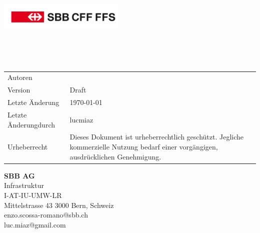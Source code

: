 \pagestyle{title}
\begin{titlepage}
	\sffamily
	\begin{flushright}
	\includegraphics[width=60mm]{packages/logo.pdf}
	\end{flushright}
	\vspace{10\baselineskip}
	\parbox{165mm}{{\noindent\Huge\bfseries \thetitle}\\[\baselineskip]
	\noindent\Large\bfseries }
	\\[8\baselineskip]
	{\footnotesize
	\begin{tabularx}{150mm}{@{}l X}
		Autoren 		& \theauthor \\
		Version 		& Draft\\
		Letzte Änderung	& \today\\
		Letzte Änderungdurch& lucmiaz\\
		Urheberrecht 	& Dieses Dokument ist urheberrechtlich geschützt. Jegliche kommerzielle Nutzung bedarf einer vorgängigen, ausdrücklichen Genehmigung.\\
	\end{tabularx}
	}
	\vfill 
	\parbox{100mm}{\small
	\textbf{SBB AG}\\
	Infrastruktur \\ 
	I-AT-IU-UMW-LR\\
	Mittelstrasse 43 3000 Bern, Schweiz\\
	enzo.scossa-romano@sbb.ch\\
	luc.miaz@gmail.com}
\end{titlepage}
\restoregeometry
\pagestyle{body}

